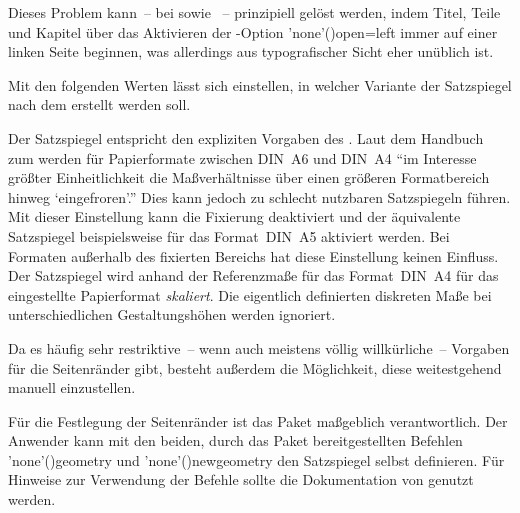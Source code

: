 \begin{DeclareEntity*}{}
\begin{DeclareEntity*}{}
\begin{DeclareEntity*}{}
\begin{Declaration}
\begin{DeclareValues}{}
  Dieses Problem kann~-- bei  sowie ~-- 
  prinzipiell gelöst werden, indem Titel, Teile und Kapitel über das Aktivieren 
  der \KOMAScript-Option \Option'none'(){open=left} immer 
  auf einer linken Seite beginnen, was allerdings aus typografischer Sicht eher 
  unüblich ist.
\end{DeclareValues}

%
Mit den folgenden Werten lässt sich einstellen, in welcher Variante der 
Satzspiegel nach dem \TUDCD erstellt werden soll.
\begin{DeclareValues}{}
  Der Satzspiegel entspricht den expliziten Vorgaben des \CDs.
  Laut dem Handbuch zum \CD werden für Papierformate zwischen DIN~A6 und DIN~A4 
  \enquote{im Interesse größter Einheitlichkeit die Maßverhältnisse über einen 
  größeren Formatbereich hinweg \enquote{eingefroren}.} Dies kann jedoch zu 
  schlecht nutzbaren Satzspiegeln führen. Mit dieser Einstellung kann die 
  Fixierung deaktiviert und der äquivalente Satzspiegel beispielsweise für das 
  Format~DIN~A5 aktiviert werden. Bei Formaten außerhalb des fixierten Bereichs 
  hat diese Einstellung keinen Einfluss. 
  Der Satzspiegel wird anhand der Referenzmaße für das Format~DIN~A4 für das 
  eingestellte Papierformat \emph{skaliert}. Die eigentlich definierten 
  diskreten Maße bei unterschiedlichen Gestaltungshöhen werden ignoriert.
\end{DeclareValues}

%
Da es häufig sehr restriktive~-- wenn auch meistens völlig willkürliche~-- 
Vorgaben für die Seitenränder gibt, besteht außerdem die Möglichkeit, diese 
weitestgehend manuell einzustellen. 
\begin{DeclareValues}{}
  Für die Festlegung der Seitenränder ist das Paket  
  maßgeblich verantwortlich. Der Anwender kann mit den beiden, durch das Paket 
  bereitgestellten Befehlen \Macro'none'(){geometry} und 
  \Macro'none'(){newgeometry} den Satzspiegel selbst 
  definieren. Für Hinweise zur Verwendung der Befehle sollte die Dokumentation 
  von  genutzt werden.
\end{DeclareValues}
\end{Declaration}


\end{DeclareEntity*}
\end{DeclareEntity*}
\end{DeclareEntity*}
